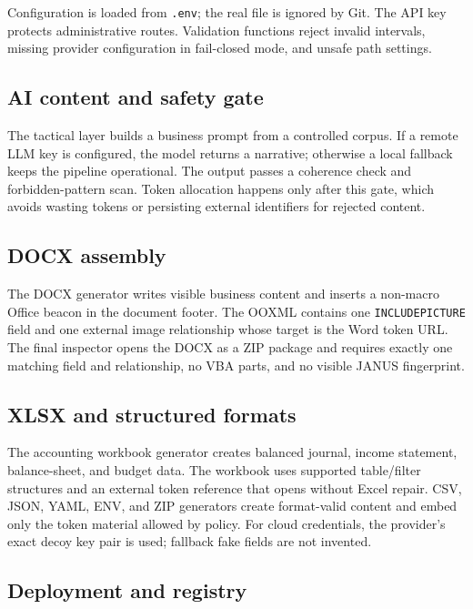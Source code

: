 Configuration is loaded from \texttt{.env}; the real file is ignored by Git.
The API key protects administrative routes. Validation functions reject invalid
intervals, missing provider configuration in fail-closed mode, and unsafe path
settings.

\subsection{AI content and safety gate}

The tactical layer builds a business prompt from a controlled corpus. If a
remote LLM key is configured, the model returns a narrative; otherwise a local
fallback keeps the pipeline operational. The output passes a coherence check
and forbidden-pattern scan. Token allocation happens only after this gate,
which avoids wasting tokens or persisting external identifiers for rejected
content.

\subsection{DOCX assembly}

The DOCX generator writes visible business content and inserts a non-macro
Office beacon in the document footer. The OOXML contains one
\texttt{INCLUDEPICTURE} field and one external image relationship whose target
is the Word token URL. The final inspector opens the DOCX as a ZIP package and
requires exactly one matching field and relationship, no VBA parts, and no
visible JANUS fingerprint.

\subsection{XLSX and structured formats}

The accounting workbook generator creates balanced journal, income statement,
balance-sheet, and budget data. The workbook uses supported table/filter
structures and an external token reference that opens without Excel repair.
CSV, JSON, YAML, ENV, and ZIP generators create format-valid content and embed
only the token material allowed by policy. For cloud credentials, the provider's
exact decoy key pair is used; fallback fake fields are not invented.

\subsection{Deployment and registry}

